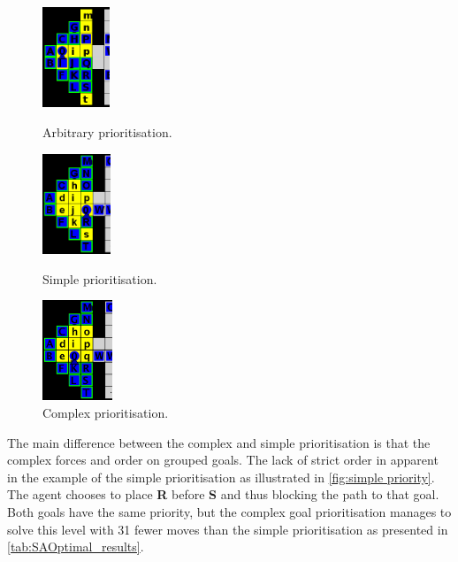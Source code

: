 \begin{figure}[h!]
  \centering
  \begin{minipage}{.30\columnwidth}
    \centering
    \includegraphics[height=3cm]{graphics/no_priority_block.png}
    \caption{\label{fig:no priority}Arbi\-tra\-ry prioritisation.}
  \end{minipage}%
  \hspace{10pt}%
  \begin{minipage}{.30\columnwidth}
    \centering
    \includegraphics[height=3cm]{graphics/simple_priority_block.PNG}
    \caption{\label{fig:simple priority}Simple prioritisation.}
  \end{minipage}%
  \hspace{10pt}%
  \begin{minipage}{.30\columnwidth}
    \centering
    \includegraphics[height=3cm]{graphics/complex_priority.png}
    \caption{\label{fig:no priority}Comp\-lex prioritisation.}
  \end{minipage}
\end{figure}

The main difference between the complex and simple prioritisation is that the complex forces and order on grouped goals.
The lack of strict order in apparent in the example of the simple prioritisation as illustrated in \cref{fig:simple priority}.
The agent chooses to place \textbf{R} before \textbf{S} and thus blocking the path to that goal.
Both goals have the same priority, but the complex goal prioritisation manages to solve this level with 31 fewer moves than the simple prioritisation as presented in \cref{tab:SAOptimal_results}.

